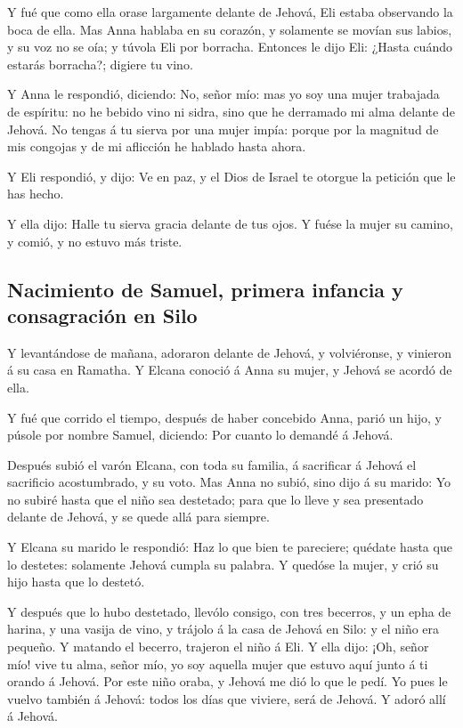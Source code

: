  Y fué que como ella orase largamente delante de Jehová,
Eli estaba observando la boca de ella.  Mas Anna hablaba en
su corazón, y solamente se movían sus labios, y su voz no se oía; y
túvola Eli por borracha.  Entonces le dijo Eli: ¿Hasta
cuándo estarás borracha?; digiere tu vino.

 Y Anna le respondió, diciendo: No, señor mío: mas yo soy
una mujer trabajada de espíritu: no he bebido vino ni sidra, sino que he
derramado mi alma delante de Jehová.  No tengas á tu sierva
por una mujer impía: porque por la magnitud de mis congojas y de mi
aflicción he hablado hasta ahora.

 Y Eli respondió, y dijo: Ve en paz, y el Dios de Israel te
otorgue la petición que le has hecho.

 Y ella dijo: Halle tu sierva gracia delante de tus ojos. Y
fuése la mujer su camino, y comió, y no estuvo más triste.

\hypertarget{nacimiento-de-samuel-primera-infancia-y-consagraciuxf3n-en-silo}{%
\subsection{Nacimiento de Samuel, primera infancia y consagración en
Silo}\label{nacimiento-de-samuel-primera-infancia-y-consagraciuxf3n-en-silo}}

 Y levantándose de mañana, adoraron delante de Jehová, y
volviéronse, y vinieron á su casa en Ramatha. Y Elcana conoció á Anna su
mujer, y Jehová se acordó de ella.

 Y fué que corrido el tiempo, después de haber concebido
Anna, parió un hijo, y púsole por nombre Samuel, diciendo: Por cuanto lo
demandé á Jehová.

 Después subió el varón Elcana, con toda su familia, á
sacrificar á Jehová el sacrificio acostumbrado, y su voto. 
Mas Anna no subió, sino dijo á su marido: Yo no subiré hasta que el niño
sea destetado; para que lo lleve y sea presentado delante de Jehová, y
se quede allá para siempre.

 Y Elcana su marido le respondió: Haz lo que bien te
pareciere; quédate hasta que lo destetes: solamente Jehová cumpla su
palabra. Y quedóse la mujer, y crió su hijo hasta que lo destetó.

 Y después que lo hubo destetado, llevólo consigo, con tres
becerros, y un epha de harina, y una vasija de vino, y trájolo á la casa
de Jehová en Silo: y el niño era pequeño.  Y matando el
becerro, trajeron el niño á Eli.  Y ella dijo: ¡Oh, señor
mío! vive tu alma, señor mío, yo soy aquella mujer que estuvo aquí junto
á ti orando á Jehová.  Por este niño oraba, y Jehová me dió
lo que le pedí.  Yo pues le vuelvo también á Jehová: todos
los días que viviere, será de Jehová. Y adoró allí á Jehová.

